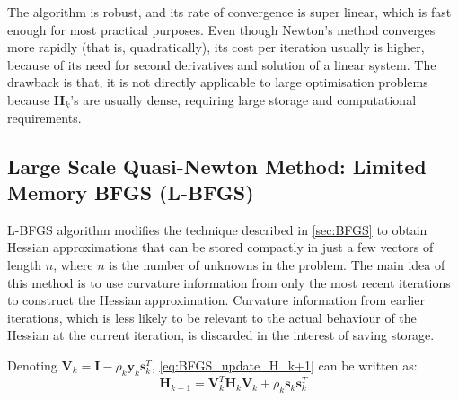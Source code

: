 The algorithm is robust, and its rate of convergence is super linear, which is fast enough for most practical purposes. Even though Newton's method converges more rapidly (that is, quadratically), its cost per iteration usually is higher, because of its need for second derivatives and solution of a linear system. The drawback is that, it is not directly applicable to large optimisation problems because $\textbf{H}_k$'s are usually dense, requiring large storage and computational requirements. \cite{Nocedal2006}



\subsection{Large Scale Quasi-Newton Method: Limited Memory BFGS (L-BFGS)}\label{sec:L-BFGS}
L-BFGS algorithm \cite{Liu1989} modifies the technique described in \cref{sec:BFGS} to obtain Hessian approximations that can be stored compactly in just a few vectors of length $n$, where $n$ is the number of unknowns in the problem. The main idea of this method is to use curvature information from only the most recent iterations to construct the Hessian approximation. Curvature information from earlier iterations, which is less likely to be relevant to the actual behaviour of the Hessian at the current iteration, is discarded in the interest of saving storage. \cite{Nocedal2006}

Denoting $\textbf{V}_k = \textbf{I} - \rho_k\textbf{y}_k\textbf{s}_k^T$, \cref{eq:BFGS_update_H_k+1} can be written as:
\begin{equation}
  \textbf{H}_{k+1} = \textbf{V}_k^T \textbf{H}_{k} \textbf{V}_k +\rho_k\textbf{s}_k\textbf{s}_k^T
\end{equation}

